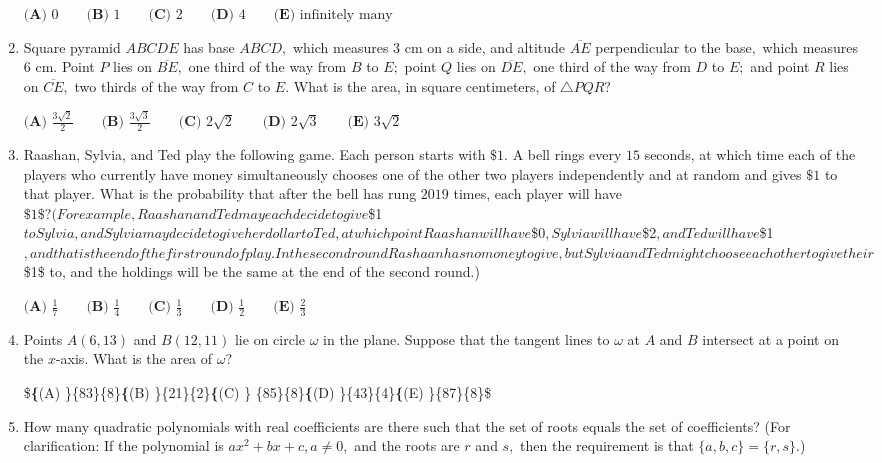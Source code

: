 \documentclass{article}
\begin{document}
\begin{enumerate}[label=\arabic*., itemsep=0.5em]
$\textbf{(A) }0\qquad\textbf{(B) }1\qquad\textbf{(C) }2\qquad\textbf{(D) }4\qquad\textbf{(E) }\text{infinitely many}$\par \vspace{0.5em}\item Square pyramid $ABCDE$ has base $ABCD,$ which measures $3$ cm on a side, and altitude $\overline{AE}$ perpendicular to the base$,$ which measures $6$ cm. Point $P$ lies on $\overline{BE},$ one third of the way from $B$ to $E;$ point $Q$ lies on $\overline{DE},$ one third of the way from $D$ to $E;$ and point $R$ lies on $\overline{CE},$ two thirds of the way from $C$ to $E.$ What is the area, in square centimeters, of $\triangle PQR?$

$\textbf{(A) } \frac{3\sqrt2}{2} \qquad\textbf{(B) } \frac{3\sqrt3}{2} \qquad\textbf{(C) } 2\sqrt2 \qquad\textbf{(D) } 2\sqrt3 \qquad\textbf{(E) } 3\sqrt2$\par \vspace{0.5em}\item Raashan, Sylvia, and Ted play the following game. Each person starts with $\$1$. A bell rings every $15$ seconds, at which time each of the players who currently have money simultaneously chooses one of the other two players independently and at random and gives $\$1$ to that player. What is the probability that after the bell has rung $2019$ times, each player will have $\$1\$? 
(For example, Raashan and Ted may each decide to give $\$1$ to Sylvia, and Sylvia may decide to give her dollar to Ted, at which point Raashan will have $\$0$, Sylvia will have $\$2$, and Ted will have $\$1$, and that is the end of the first round of play. In the second round Rashaan has no money to give, but Sylvia and Ted might choose each other to give their $ \$1\$ to, and the holdings will be the same at the end of the second round.)

$\textbf{(A) } \frac{1}{7} \qquad\textbf{(B) } \frac{1}{4} \qquad\textbf{(C) } \frac{1}{3} \qquad\textbf{(D) } \frac{1}{2} \qquad\textbf{(E) } \frac{2}{3}$\par \vspace{0.5em}\item Points $A(6,13)$ and $B(12,11)$ lie on circle $\omega$ in the plane. Suppose that the tangent lines to $\omega$ at $A$ and $B$ intersect at a point on the $x$-axis. What is the area of $\omega$?

\$\textbf\{(A) \}\frac\{83\pi\}\{8\}\qquad\textbf\{(B) \}\frac\{21\pi\}\{2\}\qquad\textbf\{(C) \}
\frac\{85\pi\}\{8\}\qquad\textbf\{(D) \}\frac\{43\pi\}\{4\}\qquad\textbf\{(E) \}\frac\{87\pi\}\{8\}\$\par \vspace{0.5em}\item How many quadratic polynomials with real coefficients are there such that the set of roots equals the set of coefficients? (For clarification: If the polynomial is $ax^2+bx+c,a\neq 0,$ and the roots are $r$ and $s,$ then the requirement is that $\{a,b,c\}=\{r,s\}$.)


\end{enumerate}
\end{document}
